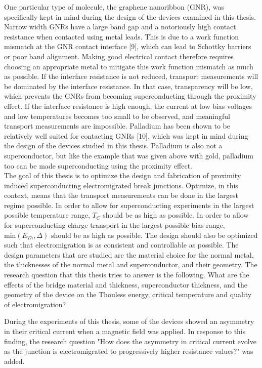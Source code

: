 One particular type of molecule, the graphene nanoribbon (GNR), was specifically kept in mind during the design of the devices examined in this thesis. Narrow width GNRs have a large band gap and a notoriously high contact resistance when contacted using metal leads. This is due to a work function mismatch at the GNR contact interface [9], which can lead to Schottky barriers or poor band alignment. Making good electrical contact therefore requires choosing an appropriate metal to mitigate this work function mismatch as much as possible. If the interface resistance is not reduced, transport measurements will be dominated by the interface resistance. In that case, transparency will be low, which prevents the GNRs from becoming superconducting through the proximity effect. If the interface resistance is high enough, the current at low bias voltages and low temperatures becomes too small to be observed, and meaningful transport measurements are impossible. Palladium has been shown to be relatively well suited for contacting GNRs [10], which was kept in mind during the design of the devices studied in this thesis. Palladium is also not a superconductor, but like the example that was given above with gold, palladium too can be made superconducting using the proximity effect. \\

The goal of this thesis is to optimize the design and fabrication of proximity induced superconducting electromigrated break junctions. Optimize, in this context, means that the transport measurements can be done in the largest regime possible. In order to allow for superconducting experiments in the largest possible temperature range, $T_C$ should be as high as possible. In order to allow for superconducting charge transport in the largest possible bias range, $\mathrm{min}\left(E_{Th}, \Delta\right)$ should be as high as possible. The design should also be optimized such that electromigration is as consistent and controllable as possible. The design parameters that are studied are the material choice for the normal metal, the thicknesses of the normal metal and superconductor, and their geometry. The research question that this thesis tries to answer is the following. What are the effects of the bridge material and thickness, superconductor thickness, and the geometry of the device on the Thouless energy, critical temperature and quality of electromigration? 

During the experiments of this thesis, some of the devices showed an asymmetry in their critical current when a magnetic field was applied. In response to this finding, the research question "How does the asymmetry in critical current evolve as the junction is electromigrated to progressively higher resistance values?" was added.


